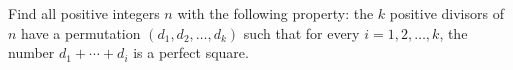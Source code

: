 Find all positive integers $n$ with the following property: the $k$ positive divisors of $n$ have a permutation $(d_1, d_2, \ldots, d_k)$ such that for every $i = 1, 2, \ldots, k$, the number $d_1 + \cdots + d_i$ is a perfect square.
